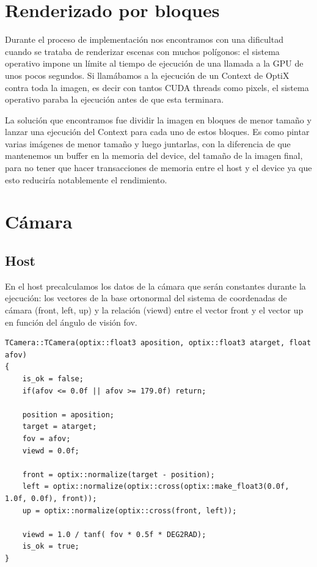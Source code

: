 \clearpage

\section{Renderizado por bloques}

Durante el proceso de implementación nos encontramos con una dificultad cuando se trataba de renderizar escenas con muchos polígonos: el sistema operativo impone un límite al tiempo de ejecución de una llamada a la GPU de unos pocos segundos. Si llamábamos a la ejecución de un Context de OptiX contra toda la imagen, es decir con tantos CUDA threads como pixels, el sistema operativo paraba la ejecución antes de que esta terminara.

\medskip

La solución que encontramos fue dividir la imagen en bloques de menor tamaño y lanzar una ejecución del Context para cada uno de estos bloques. Es como pintar varias imágenes de menor tamaño y luego juntarlas, con la diferencia de que mantenemos un buffer en la memoria del device, del tamaño de la imagen final, para no tener que hacer transacciones de memoria entre el host y el device ya que esto reduciría notablemente el rendimiento.

\clearpage

\section{Cámara}

\subsection{Host}

En el host precalculamos los datos de la cámara que serán constantes durante la ejecución: los vectores de la base ortonormal del sistema de coordenadas de cámara (front, left, up) y la relación (viewd) entre el vector front y el vector up en función del ángulo de visión fov.

\begin{lstlisting}
TCamera::TCamera(optix::float3 aposition, optix::float3 atarget, float afov)
{
	is_ok = false;
	if(afov <= 0.0f || afov >= 179.0f) return;

	position = aposition;
	target = atarget;
	fov = afov;
	viewd = 0.0f;

	front = optix::normalize(target - position);
	left = optix::normalize(optix::cross(optix::make_float3(0.0f, 1.0f, 0.0f), front));
	up = optix::normalize(optix::cross(front, left));

	viewd = 1.0 / tanf( fov * 0.5f * DEG2RAD);
	is_ok = true;		
}
\end{lstlisting}

